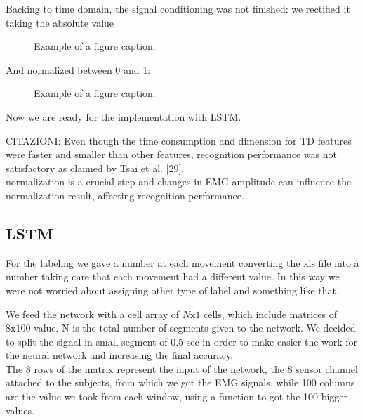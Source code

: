 \documentclass[journal]{IEEEtran}
\begin{document}
Backing to time domain, the signal conditioning was not finished: we rectified it taking the absolute value
\begin{figure}[h]
	\caption{Example of a figure caption.}
	\label{fig4}
\end{figure}
And normalized between 0 and 1:
\begin{figure}[h]
	\caption{Example of a figure caption.}
	\label{fig5}
\end{figure}
Now we are ready for the implementation with LSTM.

CITAZIONI:
Even though the time consumption and dimension for TD features were
faster and smaller than other features, recognition performance was not satisfactory as claimed by
Tsai et al. [29].
\\
normalization
is a crucial step and changes in EMG amplitude can influence the normalization result, affecting
recognition performance.
\\


\subsection{LSTM}
For the labeling we gave a number at each movement converting the xls file into a number taking care that each movement had a different value. In this way we were not worried about assigning other type of label and something like that.

We feed the network with a cell array of $N\text{x}1$ cells, which include matrices of $8\text{x}100$ value. N is the total number of segments given to the network. We decided to split the signal in small segment of 0.5 sec in order to make easier the work for the neural network and increasing the final accuracy. \\
The 8 rows of the matrix represent the input of the network, the 8 sensor channel attached to the subjects, from which we got the EMG signals, while 100 columns are the value we took from each window, using a function to got the 100 bigger values. 
\end{document}
